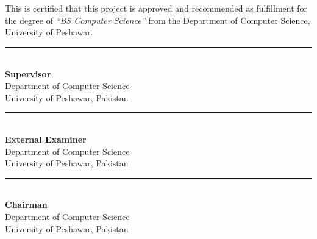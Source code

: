\cleardoublepage
{}
\chapter*{}

This is certified that this project is approved and recommended as fulfillment for the degree of \emph{``BS Computer Science''} from the Department of Computer Science, University of Peshawar.

\vspace{5cm}

\noindent
\begin{minipage}[t]{0.45\textwidth}
    \rule{6cm}{0.5pt}\\
    \textbf{Supervisor}\\
    Department of Computer Science\\
    University of Peshawar, Pakistan
\end{minipage}
\hfill
\begin{minipage}[t]{0.45\textwidth}
    \rule{6cm}{0.5pt}\\
    \textbf{External Examiner}\\
    Department of Computer Science\\
    University of Peshawar, Pakistan
\end{minipage}

\vspace{4cm}

\noindent
\begin{minipage}[t]{0.45\textwidth}
    \rule{6cm}{0.5pt}\\
    \textbf{Chairman}\\
    Department of Computer Science\\
    University of Peshawar, Pakistan
\end{minipage}

\newpage
